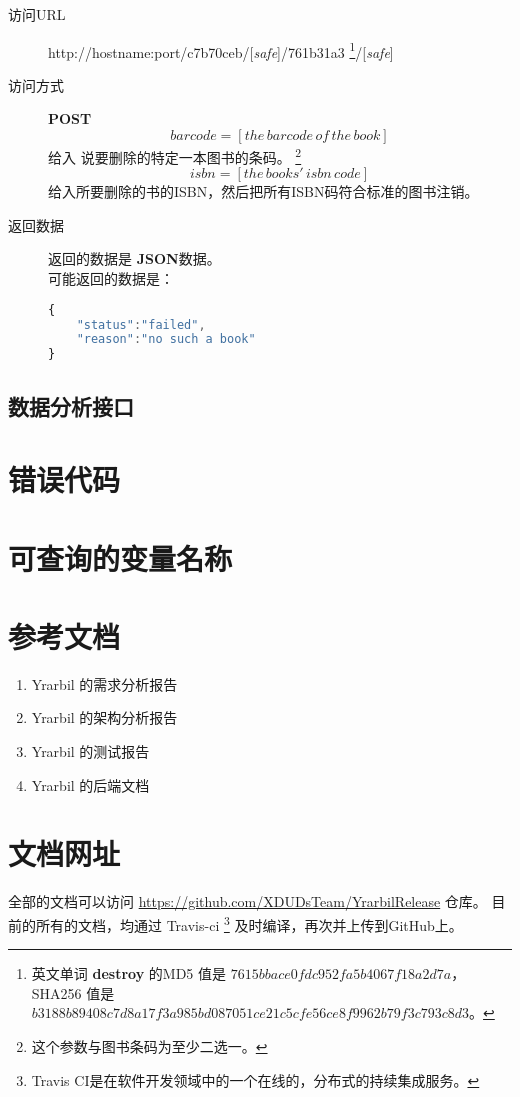 \documentclass[UTF8]{article}
\def\safe{/[\textit{safe}]}
\def\POST{\colorbox[rgb]{0.77,0.53,0.97}{\textbf{POST}}}
\def\bfJSON{\textbf{JSON}}
\def\viaurl{\item[{\quad\colorbox[rgb]{0.47,0.88,0.89}{访问URL}}]}
\def\viareq#1{\item[{\quad\colorbox[rgb]{0.57,0.88,0.99}{访问方式}}] #1}
\def\rtdata{\item[{\quad\colorbox[rgb]{0.70,0.9,0.59}{返回数据}}]}
\begin{document}
        \begin{description}
		\viaurl http://hostname:port/c7b70ceb\safe/761b31a3
        \footnote{
            英文单词 \textbf{destroy} 的MD5 值是
            $7615bbace0fdc952fa5b4067f18a2d7a$，
            SHA256 值是
            $b3188b89408c7d8a17f3a985bd087051ce21c5cfe56ce8f9962b79f3c793c8d3$。
        }\safe
        \viareq{\POST}
        				$$barcode=[the\,barcode\,of\,the\,book]$$
          给入 说要删除的特定一本图书的条码。
        \footnote{这个参数与图书条码为至少二选一。}
          $$isbn=[the\,books'\,isbn\,code]$$
          给入所要删除的书的ISBN，然后把所有ISBN码符合标准的图书注销。
        \rtdata 返回的数据是 \bfJSON 数据。
        \\ 可能返回的数据是：
        \begin{lstlisting}[language=JavaScript]
{
    "status":"failed",
    "reason":"no such a book"
}
        \end{lstlisting}
        \end{description}
        \subsection{数据分析接口}

		\section{错误代码}

		\section{可查询的变量名称}



    \newpage
    \begin{appendices}
    \section{参考文档}
    \begin{enumerate}
        \item Yrarbil 的需求分析报告
        \item Yrarbil 的架构分析报告
        \item Yrarbil 的测试报告
        \item Yrarbil 的后端文档
    \end{enumerate}
    \section{文档网址}
         全部的文档可以访问 \url{https://github.com/XDUDsTeam/YrarbilRelease} 仓库。
      目前的所有的文档，均通过 Travis-ci
      \footnote{Travis CI是在软件开发领域中的一个在线的，分布式的持续集成服务。}
      及时编译，再次并上传到GitHub上。
      
    \end{appendices}
\end{document}
